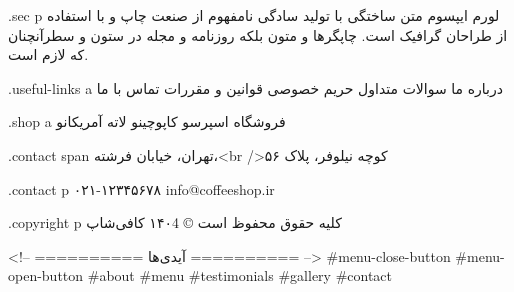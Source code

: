 .sec p
لورم ایپسوم متن ساختگی با تولید سادگی نامفهوم از صنعت چاپ و با استفاده از طراحان گرافیک است. چاپگرها و متون بلکه روزنامه و مجله در ستون و سطرآنچنان که لازم است.

.useful-links a
درباره ما
سوالات متداول
حریم خصوصی
قوانین و مقررات
تماس با ما

.shop a
فروشگاه
اسپرسو
کاپوچینو
لاته
آمریکانو

.contact span
تهران، خیابان فرشته،<br />کوچه نیلوفر، پلاک ۵۶

.contact p
۰۲۱-۱۲۳۴۵۶۷۸
info@coffeeshop.ir

.copyright p
کلیه حقوق محفوظ است © ۱۴۰4 کافی‌شاپ

<!-- ========== آیدی‌ها ========== -->
#menu-close-button
#menu-open-button
#about
#menu
#testimonials
#gallery
#contact 